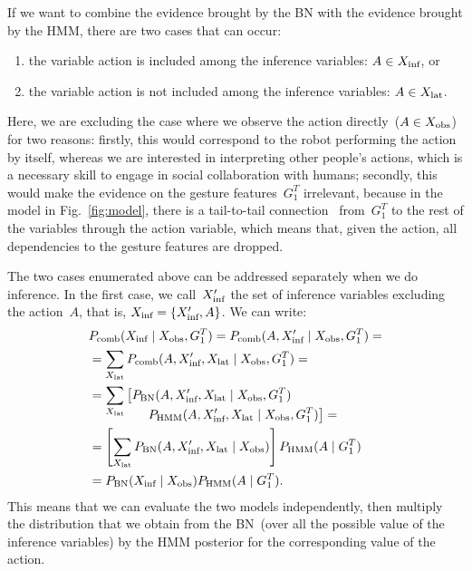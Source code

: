 If we want to combine the evidence brought by the \ac{BN} with the evidence brought by the \ac{HMM}, there are two cases that can occur:
\begin{enumerate}
\item the variable action is included among the inference variables: $A \in X_\text{inf}$, or

\item the variable action is not included among the inference variables: $A \in X_\text{lat}$.
\end{enumerate}

Here, we are excluding the case where we observe the action directly~($A \in X_\text{obs}$) for two reasons: firstly, this would correspond to the robot performing the action by itself, whereas we are interested in interpreting other people's actions, which is a necessary skill to engage in social collaboration with humans;
secondly, this would make the evidence on the gesture features~$G_1^T$ irrelevant, because in the model in Fig.~\ref{fig:model}, there is a tail-to-tail connection~\cite{pearl:2014:probabilistic} from~$G_1^T$ to the rest of the variables through the action variable, which means that, given the action, all dependencies to the gesture features are dropped.

The two cases enumerated above can be addressed separately when we do inference.
In the first case, we call~$X_\text{inf}^\prime$ the set of inference variables excluding the action~$A$, that is, $X_\text{inf} = \{X_\text{inf}^\prime, A\}$.
We can write:
\begin{align} \label{eq:fusion_excluding_action}
  & \pcomb(\xinf \given  \xobs, G_1^T) = \pcomb(A, \xinf^\prime \given  \xobs, G_1^T)= \nonumber \\
  &= \sum_{\xlat} \pcomb(A, \xinf^\prime, \xlat \given \xobs, G_1^T)= \nonumber\\
  &= \sum_{\xlat} \left[\pbn(A, \xinf^\prime, \xlat \given \xobs, G_1^T)\right. \nonumber \\[-4mm]
    & \mspace{80mu} \left.\phmm(A, \xinf^\prime, \xlat \given \xobs, G_1^T)\right]= \nonumber \\
  &= \left[\sum_{\xlat} \pbn(A, \xinf^\prime, \xlat \given \xobs)\right] \phmm(A \given G_1^T) \nonumber \\
  &= \pbn(\xinf \given \xobs) \phmm(A \given G_1^T).
\end{align}
This means that we can evaluate the two models independently, then multiply the distribution that we obtain from the \ac{BN}~(over all the possible value of the inference variables) by the \ac{HMM} posterior for the corresponding value of the action.

